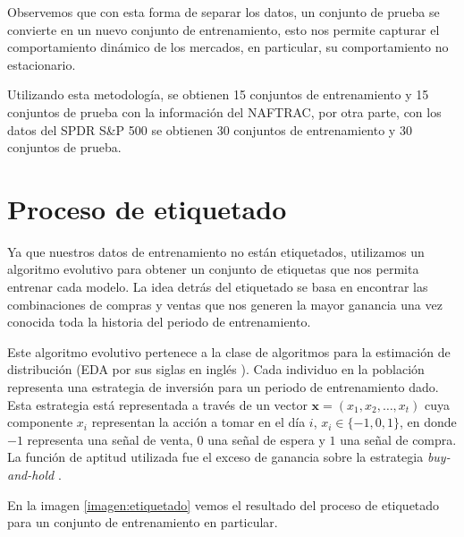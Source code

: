 \documentclass[12pt]{scrbook}
\theoremstyle{break}
\theoremstyle{break}
\newcommand{\buyhold}{\textit{buy-and-hold }}
\begin{document}
Observemos que con esta forma de separar los datos, un conjunto de prueba se convierte en un nuevo conjunto de entrenamiento, esto nos permite capturar el comportamiento dinámico de los mercados, en particular, su comportamiento no estacionario.

Utilizando esta metodología, se obtienen 15 conjuntos de entrenamiento y 15 conjuntos de prueba con la información del NAFTRAC, por otra parte, con los datos del SPDR S\&P 500 se obtienen 30 conjuntos de entrenamiento y 30 conjuntos de prueba.



\section{Proceso de etiquetado}
\label{seccion:proceso etiquetado}
Ya que nuestros datos de entrenamiento no están etiquetados, utilizamos un algoritmo evolutivo para obtener un conjunto de etiquetas que nos permita entrenar cada modelo. La idea detrás del etiquetado se basa en encontrar las combinaciones de compras y ventas que nos generen la mayor ganancia una vez conocida toda la historia del periodo de entrenamiento.

Este algoritmo evolutivo pertenece a la clase de algoritmos para la estimación de distribución (EDA por sus siglas en inglés \cite{simon2013evolutionary}). Cada individuo en la población representa una estrategia de inversión para un periodo de entrenamiento dado. Esta estrategia está representada a través de un vector $\mathbf{x} = (x_1, x_2, \ldots, x_t)$ cuya componente $x_i$ representan la acción a tomar en el día $i$, $x_i \in \{-1,0,1\}$, en donde $-1$ representa una señal de venta, $0$ una señal de espera y $1$ una señal de compra. La función de aptitud utilizada fue el exceso de ganancia sobre la estrategia \buyhold.

En la imagen \ref{imagen:etiquetado} vemos el resultado del proceso de etiquetado para un conjunto de entrenamiento en particular.
\end{document}
